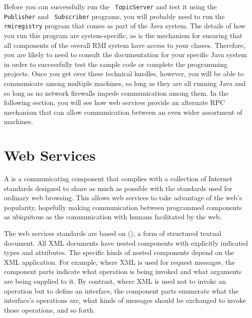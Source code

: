 Before you can successfully run the {\tt
TopicServer} and test it using the {\tt Publisher} and {\tt
Subscriber} programs, you will probably need to run the {\tt rmiregistry} program that comes
as part of the Java system.  The details of how you run this program are
system-specific, as is the mechanism for ensuring that all components
of the overall RMI system have access to your classes.  Therefore, you
are likely to need to consult the documentation for your specific Java
system in order to successfully test the sample code or complete
the programming projects.  Once you get over these technical hurdles,
however, you will be able to communicate among multiple machines, so
long as they are all running Java and so long as no network firewalls
impede communication among them.  In the following section, you will
see how web services provide an alternate RPC mechanism
that can allow communication between an even wider assortment of machines.

\section{Web Services}\label{web-services-section}

A  is a communicating component that complies with a
collection of Internet standards designed to share as much as possible
with the standards used for ordinary web browsing.  This allows web
services to take advantage of the web's popularity, hopefully making
communication between programmed components as ubiquitous as the
communication with humans facilitated by the web.

The web services standards are based on  (), a form of structured
textual document.  All XML documents have nested components with
explicitly indicated types and attributes.  The specific kinds of
nested components depend on the XML application.  For example, where
XML is used for request messages, the component parts indicate what
operation is being invoked and what arguments are being supplied to
it.  By contrast, where XML is used not to invoke an operation but to
define an interface, the component parts enumerate what the
interface's operations are, what kinds of messages should be exchanged
to invoke those operations, and so forth.

